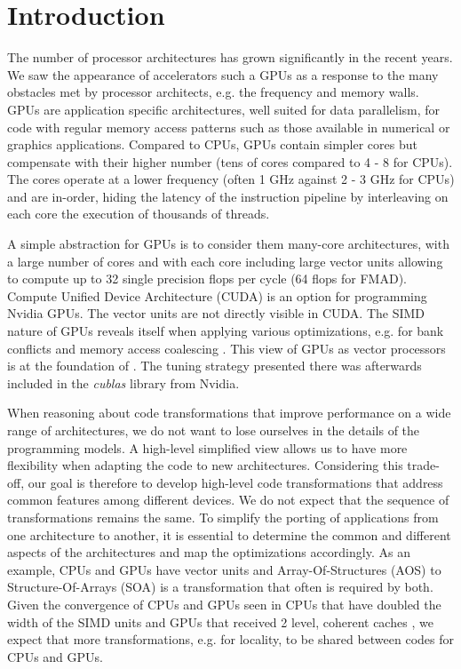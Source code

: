 \section{Introduction}
The number of processor architectures has grown significantly in the recent
years. We saw the appearance of accelerators such a GPUs as a response to the
many obstacles met by processor architects, e.g. the frequency and memory walls.
GPUs are application specific architectures, well suited for data parallelism,
for code with regular memory access patterns such as those available in
numerical or graphics applications. Compared to CPUs, GPUs contain simpler cores
but compensate with their higher number (tens of cores compared to 4 - 8 for
CPUs). The cores operate at a lower frequency (often 1 GHz against 2 - 3 GHz for
CPUs) and are in-order, hiding the latency of the instruction pipeline by
interleaving on each core the execution of thousands of threads.

A simple abstraction for GPUs is to consider them many-core architectures, with
a large number of cores and with each core including large vector units
allowing to compute up to 32 single precision flops per cycle (64 flops for
FMAD). Compute Unified Device Architecture (CUDA) is an option for programming
Nvidia GPUs. The vector units are not directly visible in CUDA. The SIMD nature
of GPUs reveals itself when applying various optimizations, e.g. for bank
conflicts and memory access coalescing \cite{cuda}. This view of GPUs as vector
processors is at the foundation of \cite{Volkov:2008:BGT:1413370.1413402}. The
tuning strategy presented there was afterwards included in the \textit{cublas}
library from Nvidia.

When reasoning about code transformations that improve performance on a wide
range of architectures, we do not want to lose ourselves in the details of the
programming models. A high-level simplified view allows us to have more
flexibility when adapting the code to new architectures. Considering this
trade-off, our goal is therefore to develop high-level code transformations that
address common features among different devices. We do not expect that the
sequence of transformations remains the same. To simplify the porting of
applications from one architecture to another, it is essential to determine the
common and different aspects of the architectures and map the optimizations
accordingly. As an example, CPUs and GPUs have vector units and
Array-Of-Structures (AOS) to Structure-Of-Arrays (SOA) is a transformation that
often is required by both. Given the convergence of CPUs and GPUs seen in CPUs
that have doubled the width of the SIMD units and GPUs that received 2 level,
coherent caches \cite{fermi}, we expect that more transformations, e.g. for
locality, to be shared between codes for CPUs and GPUs.

